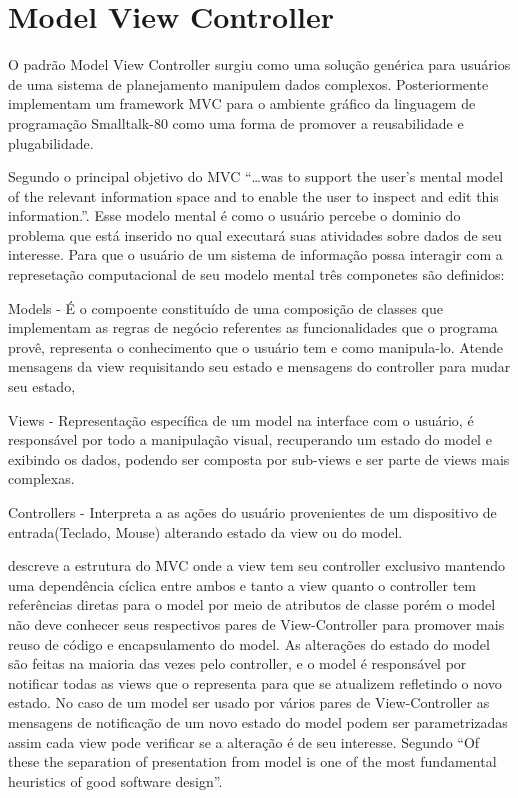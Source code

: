 \section{Model View Controller}

O padrão Model View Controller surgiu como uma solução genérica para usuários
de uma sistema de planejamento manipulem dados complexos.
Posteriormente  implementam um framework MVC para o
ambiente gráfico da linguagem de programação Smalltalk-80 como uma forma de
promover a reusabilidade e plugabilidade.

Segundo  o principal objetivo do MVC ``\ldots was to
support the user's mental model of the relevant information space and to enable
the user to inspect and edit this information.''. Esse modelo mental é como o
usuário percebe o dominio do problema que está inserido no qual executará suas
atividades sobre dados de seu interesse. Para que o usuário de um sistema de
informação possa interagir com a represetação computacional  de seu modelo
mental três componetes são definidos:

Models - É o compoente constituído de uma composição de classes que implementam
as regras de negócio referentes as funcionalidades que o programa provê,
representa o  conhecimento que o usuário tem e como manipula-lo. Atende
mensagens da view requisitando seu estado e mensagens do controller para mudar
seu estado,

Views - Representação específica de um model na interface com o usuário, é 
responsável por todo a manipulação visual, recuperando um estado do model e
exibindo os dados, podendo ser composta por sub-views e ser parte de views mais
complexas.

Controllers - Interpreta a as ações do usuário provenientes de um dispositivo de
entrada(Teclado, Mouse) alterando estado da view ou do model.




 descreve a estrutura do MVC onde a view tem seu
controller exclusivo mantendo uma dependência cíclica entre ambos e tanto a view
quanto o controller tem referências diretas para o model por meio de atributos
de classe porém o model não deve conhecer seus respectivos pares de
View-Controller para promover mais reuso de código e encapsulamento do model. As
alterações do estado do model são feitas na maioria das vezes pelo controller, e
o model é responsável por notificar todas as views que o representa para que
se atualizem refletindo o novo estado. No caso de um model ser usado por vários
pares de View-Controller as mensagens de notificação de um novo estado do model
podem ser parametrizadas assim cada view pode verificar se a alteração é de seu
interesse. Segundo  ``Of these the separation of presentation
from model is one of the most fundamental heuristics of good software design''.

